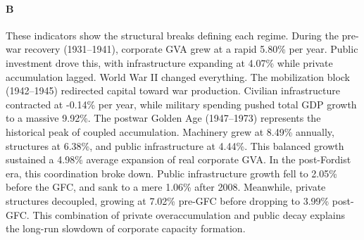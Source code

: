 \paragraph{B}
These indicators show the structural breaks defining each regime. During the pre-war recovery (1931–1941), corporate GVA grew at a rapid 5.80\% per year. Public investment drove this, with infrastructure expanding at 4.07\% while private accumulation lagged. World War II changed everything. The mobilization block (1942–1945) redirected capital toward war production. Civilian infrastructure contracted at -0.14\% per year, while military spending pushed total GDP growth to a massive 9.92\%. The postwar Golden Age (1947–1973) represents the historical peak of coupled accumulation. Machinery grew at 8.49\% annually, structures at 6.38\%, and public infrastructure at 4.44\%. This balanced growth sustained a 4.98\% average expansion of real corporate GVA. In the post-Fordist era, this coordination broke down. Public infrastructure growth fell to 2.05\% before the GFC, and sank to a mere 1.06\% after 2008. Meanwhile, private structures decoupled, growing at 7.02\% pre-GFC before dropping to 3.99\% post-GFC. This combination of private overaccumulation and public decay explains the long-run slowdown of corporate capacity formation.
